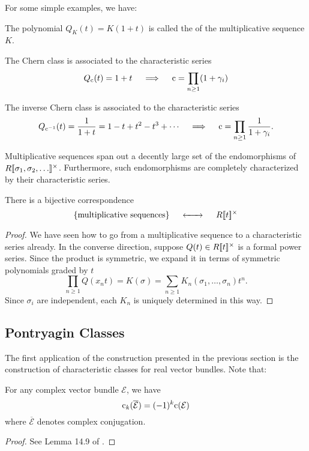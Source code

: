 For some simple examples, we have:

\begin{definition}
	The polynomial $Q_K(t)=K(1+t)$ is called the  of the multiplicative sequence $K$.
\end{definition}

\begin{example}
	The Chern class is associated to the characteristic series
	\[Q_{\mathrm{c}}(t)=1+t\quad\implies\quad \mathrm{c} = \prod_{n\geq 1} (1+\gamma_i)\]
\end{example}

\begin{example}
	The  inverse Chern class is associated to the characteristic series
	\[Q_{\mathrm{c}^{-1}}(t)=\frac{1}{1+t}=1-t+t^2-t^3+\cdots \quad\implies\quad \mathrm{c} = \prod_{n\geq 1} \frac{1}{1+\gamma_i}.\]
\end{example}

Multiplicative sequences span out a decently large set of the endomorphisms of $R[\![\sigma_1,\sigma_2,\ldots]\!]^\times$. Furthermore, such endomorphisms are completely characterized by their characteristic series.

\begin{theorem}
	There is a bijective correspondence
	\[
		\left\{\parbox{10.5em}{multiplicative sequences}\right\} \quad\lkxleftrightto\quad R\fps{t}^\times
	\]
\end{theorem}
\begin{proof}
	We have seen how to go from a multiplicative sequence to a characteristic series already. In the converse direction, suppose $Q(t)\in R[\![t]\!]^\times$ is a formal power series. Since the product is symmetric, we expand it in terms of symmetric polynomials graded by $t$
	\[
		 \prod_{n\geq 1} Q(x_n t) = K(\sigma)= \sum_{n\geq 1}K_n(\sigma_1,\ldots, \sigma_n) t^n.
	\]
	Since $\sigma_i$ are independent, each $K_n$ is uniquely determined in this way.
\end{proof}

\subsection{Pontryagin Classes}

The first application of the construction presented in the previous section is the construction of characteristic classes for real vector bundles. Note that:
\begin{proposition}\label{prop:chern-conjugation}
	For any complex vector bundle $\mathcal{E}$, we have
	\[
		\mathrm{c}_k(\overline{\mathcal{E}}) = (-1)^k\mathrm{c}(\mathcal{E})
	\]
	where $\overline{\mathcal{E}}$ denotes complex conjugation.
\end{proposition}
\begin{proof}
	See Lemma 14.9 of \cite{milnorstasheff1974}.
\end{proof}

